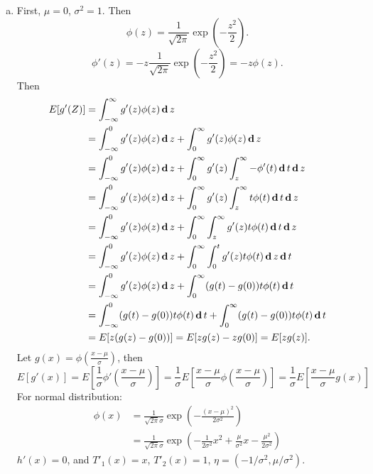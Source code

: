 \begin{solution}
    \begin{enumerate}[(a)]
        \item First, $\mu=0$, $\sigma^2=1$. Then 
        \[
            \phi(z)=\frac{1}{\sqrt{2\pi}}\exp\left(-\frac{z^2}{2}\right). 
        \]
        \[
            \phi'(z)=-z\frac{1}{\sqrt{2\pi}}\exp\left(-\frac{z^2}{2}\right)=-z\phi(z). 
        \]
        Then 
        \[
            \begin{aligned}
                E[g'(Z)]&=\int_{-\infty}^\infty g'(z)\phi(z)\,\mathbf{d}\, z\\
                &=\int_{-\infty}^0 g'(z)\phi(z)\,\mathbf{d}\, z + \int_{0}^\infty g'(z)\phi(z)\,\mathbf{d}\, z\\
                &=\int_{-\infty}^0 g'(z)\phi(z)\,\mathbf{d}\, z + \int_{0}^\infty g'(z)\int_z^\infty -\phi'(t)\,\mathbf{d}\, t \,\mathbf{d}\, z\\
                &=\int_{-\infty}^0 g'(z)\phi(z)\,\mathbf{d}\, z + \int_{0}^\infty g'(z)\int_z^\infty t\phi(t)\,\mathbf{d}\, t \,\mathbf{d}\, z\\
                &=\int_{-\infty}^0 g'(z)\phi(z)\,\mathbf{d}\, z + \int_{0}^\infty\int_z^\infty g'(z) t\phi(t)\,\mathbf{d}\, t \,\mathbf{d}\, z\\
                &=\int_{-\infty}^0 g'(z)\phi(z)\,\mathbf{d}\, z + \int_{0}^\infty\int_0^t g'(z) t\phi(t)\,\mathbf{d}\, z \,\mathbf{d}\, t\\
                &=\int_{-\infty}^0 g'(z)\phi(z)\,\mathbf{d}\, z + \int_{0}^\infty (g(t)-g(0))t\phi(t)\,\mathbf{d}\, t\\
                &=\int_{-\infty}^0 (g(t)-g(0))t\phi(t)\,\mathbf{d}\, t + \int_{0}^\infty (g(t)-g(0))t\phi(t)\,\mathbf{d}\, t\\
                &=E[z(g(z)-g(0))]=E[zg(z)-zg(0)]=E[zg(z)]. 
            \end{aligned}
        \]
        Let $g(x)=\phi\left(\frac{x-\mu}{\sigma}\right)$, then
        \[
            E[g'(x)]=E\left[\frac{1}{\sigma}\phi'\left(\frac{x-\mu}{\sigma}\right)\right]=\frac{1}{\sigma}E\left[\frac{x-\mu}{\sigma}\phi\left(\frac{x-\mu}{\sigma}\right)\right]=\frac{1}{\sigma}E\left[\frac{x-\mu}{\sigma}g(x)\right]
        \]
        For normal distribution: 
        \[
            \begin{aligned}
            \phi(x)&=\frac{1}{\sqrt{2\pi}\sigma}\exp\left(-\frac{(x-\mu)^2}{2\sigma^2}\right)\\
            &=\frac{1}{\sqrt{2\pi}\sigma}\exp\left(-\frac{1}{2\sigma^2}x^2+\frac{\mu}{\sigma^2}x-\frac{\mu^2}{2\sigma^2}\right)
            \end{aligned}
        \]
        $h'(x)=0$, and $T'_1(x)=x$, $T'_2(x)=1$, $\eta=(-1/\sigma^2, \mu/\sigma^2)$. 

\end{enumerate}
\end{solution}
